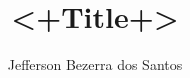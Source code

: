 \documentclass[10pt]{beamer}
\title {<+Title+>}
\author{Jefferson Bezerra dos Santos}
\begin{document}
\begin{frame}
  \maketitle
\end{frame}
\end{document}
